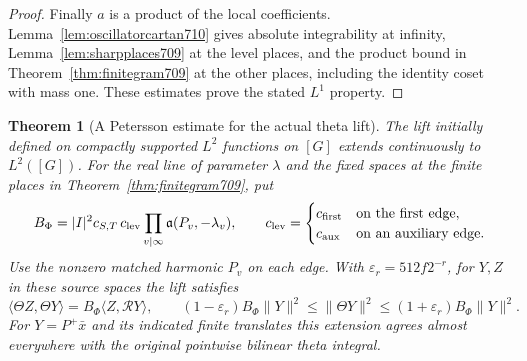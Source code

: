 \documentclass[a4paper,11pt]{article}
\newtheorem{theorem}[proposition]{Theorem}
\theoremstyle{definition}
\theoremstyle{remark}
\numberwithin{equation}{section}
\begin{document}
\begin{proof}
Finally \(a\) is a product of the local coefficients.
Lemma~\ref{lem:oscillatorcartan710} gives absolute
integrability at infinity, Lemma~\ref{lem:sharpplaces709}
at the level places, and the product bound in
Theorem~\ref{thm:finitegram709} at the other places, including
the identity coset with mass one. These estimates prove
the stated \(L^1\) property.
\end{proof}

\begin{theorem}[A Petersson estimate for the actual theta lift]\leavevmode
\label{thm:globalgram711}
The lift initially defined on compactly supported \(L^2\)
functions on \([G]\) extends continuously to \(L^2([G])\).
For the real line of parameter \(\lambda\) and the fixed
spaces at the finite places in Theorem~\ref{thm:finitegram709},
put
\[
 B_\Phi=|I|^2c_{S,T}\,c_{\rm lev}
       \prod_{v\mid\infty}\mathfrak a(P_v,-\lambda_v),\qquad
  c_{\rm lev}=
   \begin{cases}c_{\rm first}&\text{on the first edge},\\
                 c_{\rm aux}&\text{on an auxiliary edge}.
   \end{cases}
\]
Use the nonzero matched harmonic \(P_v\) on each edge.
With \(\varepsilon_r=512f2^{-r}\), for \(Y,Z\) in these
source spaces the lift satisfies
\[
 \langle\Theta Z,\Theta Y\rangle
      =B_\Phi\langle Z,\mathcal RY\rangle,\qquad
 (1-\varepsilon_r) B_\Phi\|Y\|^2
     \le\|\Theta Y\|^2\le(1+\varepsilon_r)B_\Phi\|Y\|^2 .
\]
For \(Y=P^+\bar x\) and its indicated finite translates
this extension agrees almost everywhere with the original
pointwise bilinear theta integral.
\end{theorem}
\end{document}
